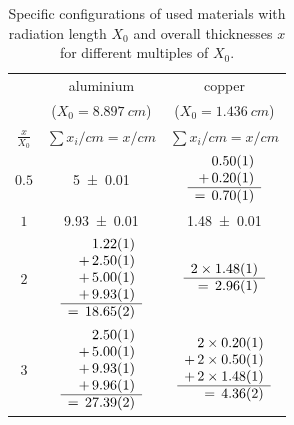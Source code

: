 \documentclass[sn-mathphys-num,iicol]{sn-jnl}
\theoremstyle{thmstyleone}
\theoremstyle{thmstyletwo}
\theoremstyle{thmstylethree}
\begin{document}
\begin{table}\centering
  \renewcommand*{\arraystretch}{1.15}
  \begin{tabular}{c|c|c}
    & aluminium & copper \\
    & {\fontsize{7}{5}\selectfont ($X_0=\SI{8.897}{cm}$)} & {\fontsize{7}{5}\selectfont ($X_0=\SI{1.436}{cm}$)} \\\hline
    $\tfrac{x}{X_0}$ & $\sum x_i/cm = x /cm$ & $\sum x_i/cm = x /cm$ \\\hline\hline\rule{0pt}{6ex}
    $0.5$ & \num{5\pm 0.01} & $\begin{array}{r}
                \num{0.5\pm 0.01} \\
                +\,\num{0.2\pm 0.01} \\\hline
                =\,\num{0.7\pm 0.01}    
              \end{array}$ \\\hline
    $1$ & \num{9.93\pm 0.01} & \num{1.48\pm 0.01} \\\hline
    $2$ & $\begin{array}{r}
      \num{1.22\pm 0.01} \\
      +\,\num{2.5\pm 0.01} \\
      +\,\num{5\pm 0.01} \\
      +\,\num{9.93\pm 0.01} \\\hline
      =\,\num{18.65\pm 0.02}
    \end{array}$ & $\begin{array}{r}
                      2\times\num{1.48\pm 0.01} \\\hline
                      =\,\num{2.96\pm 0.01}
                    \end{array}$ \\\hline
    $3$ & $\begin{array}{r}
      \num{2.5\pm 0.01} \\
      +\,\num{5\pm 0.01} \\
      +\,\num{9.93\pm 0.01} \\
      +\,\num{9.96\pm 0.01} \\\hline
      =\,\num{27.39\pm 0.02}
    \end{array}$ & $\begin{array}{r}
                      2\times\num{0.2\pm 0.01} \\
                      +\,2\times\num{0.5\pm 0.01} \\
                      +\,2\times\num{1.48\pm 0.01} \\\hline
                      =\,\num{4.36\pm 0.02}
                    \end{array}$ \\\hline
  \end{tabular}\vspace{3mm}
  \caption{Specific configurations of used materials with radiation length $X_0$ and overall thicknesses $x$ for different multiples of $X_0$.}
  \label{tab:config_materials}
\end{table}
\end{document}

